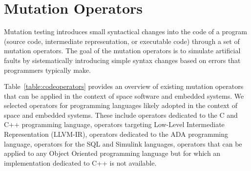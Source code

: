 
\section{Mutation Operators}
\label{sec:operators}

Mutation testing introduces small syntactical changes into the code of a program (source code, intermediate representation, or executable code) through a set of mutation operators.
The goal of the mutation operators is to simulate artificial faults by sistematically introducing  simple syntax changes based on errors that programmers typically make.


Table~\ref{table:codeoperators} provides an overview of existing mutation operators that can be applied in the context of space software and embedded systems.
We selected operators for programming languages likely adopted in the context of space and embedded systems. These include operators dedicated to the C and C++ programming language, operators targeting Low-Level Intermediate Representation (LLVM-IR), operators dedicated to the ADA programming language, operators for the SQL and Simulink languages, operators that can be applied to any Object Oriented programming language but for which an implementation dedicated to C++ is not available.

